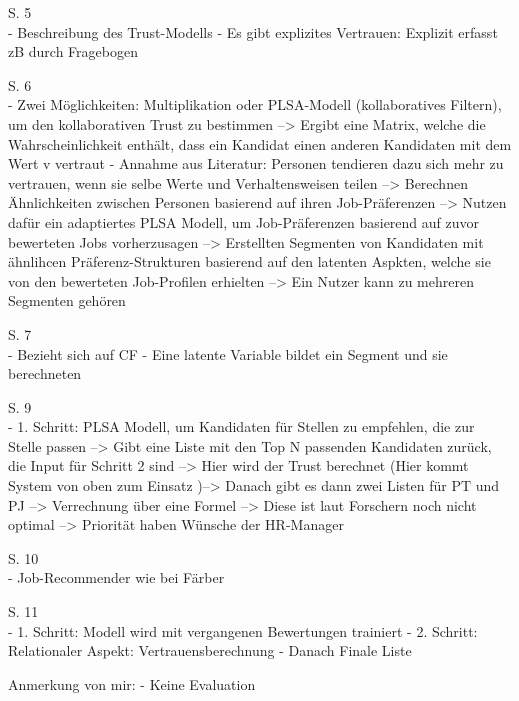 S. 5\\
- Beschreibung des Trust-Modells
- Es gibt explizites Vertrauen: Explizit erfasst zB durch Fragebogen

S. 6\\
- Zwei Möglichkeiten: Multiplikation oder PLSA-Modell (kollaboratives Filtern), um den kollaborativen Trust zu bestimmen --> Ergibt eine Matrix, welche die Wahrscheinlichkeit enthält, dass ein Kandidat einen anderen Kandidaten mit dem Wert v vertraut
- Annahme aus Literatur: Personen tendieren dazu sich mehr zu vertrauen, wenn sie selbe Werte und Verhaltensweisen teilen --> Berechnen Ähnlichkeiten zwischen Personen basierend auf ihren Job-Präferenzen --> Nutzen dafür ein adaptiertes PLSA Modell, um Job-Präferenzen basierend auf zuvor bewerteten Jobs vorherzusagen --> Erstellten Segmenten von Kandidaten mit ähnlihcen Präferenz-Strukturen basierend auf den latenten Aspkten, welche sie von den bewerteten Job-Profilen erhielten --> Ein Nutzer kann zu mehreren Segmenten gehören

S. 7\\
- Bezieht sich auf CF
- Eine latente Variable bildet ein Segment und sie berechneten

S. 9\\
- 1. Schritt: PLSA Modell, um Kandidaten für Stellen zu empfehlen, die zur Stelle passen --> Gibt eine Liste mit den Top N passenden Kandidaten zurück, die Input für Schritt 2 sind --> Hier wird der Trust berechnet (Hier kommt System von oben zum Einsatz )--> Danach gibt es dann zwei Listen für PT und PJ --> Verrechnung über eine Formel --> Diese ist laut Forschern noch nicht optimal --> Priorität haben Wünsche der HR-Manager

S. 10\\
- Job-Recommender wie bei Färber

S. 11\\
- 1. Schritt: Modell wird mit vergangenen Bewertungen trainiert
- 2. Schritt: Relationaler Aspekt: Vertrauensberechnung
- Danach Finale Liste

Anmerkung von mir:
- Keine Evaluation
